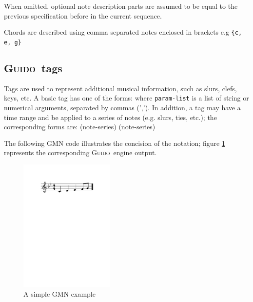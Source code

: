 \documentclass[twoside,10pt,a4paper]{article}
\newenvironment{gmncode}		{\vspace{-2mm}\small\verbatim}{\endverbatim\vspace{-2mm}}
\newcommand{\Guido}	{\textsc{Guido}}
\newcommand{\code}[1]	{{\small \texttt{#1}}}
\begin{document}
When omitted, optional note description parts are assumed to be equal to the previous specification before in the current sequence.

Chords are described using comma separated notes enclosed in brackets e.g \code{\{c, e, g\}}

\subsection{\Guido\ tags}
Tags are used to represent additional musical information, such as slurs, clefs, keys, etc. A basic tag has one of the forms:
\begin{gmncode} 
   \tagname 
\end{gmncode}
\noindent where \code{param-list} is a list of string or numerical arguments, separated by commas (','). In addition, a tag may have a time range and be applied to a series of notes (e.g. slurs, ties, etc.); the corresponding forms are:
\begin{gmncode} 
   \tagname(note-series)
   (note-series)
\end{gmncode} 

The following GMN code illustrates the concision of the notation; figure \ref{ex1} represents the corresponding \Guido\ engine output. 
\begin{gmncode} 
  [ \meter<"4/4"> \key<-2> c d e& f/8 g ]
\end{gmncode} 

\begin{figure}[h]
	\centering \includegraphics[width=47mm]{imgs/ex1}
 \caption{A simple GMN example}
 \label{ex1}
\end{figure}
\end{document}

